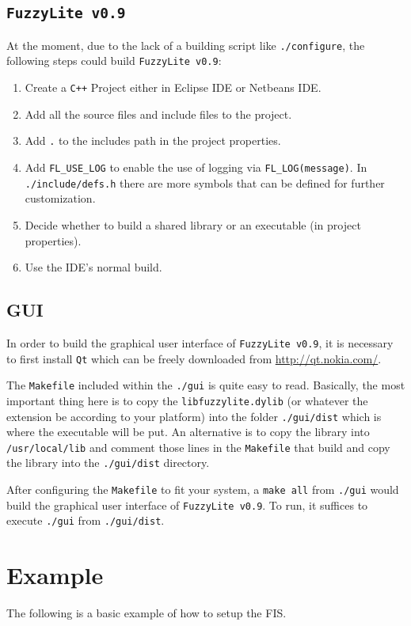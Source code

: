 \documentclass[11pt, final, a4paper]{article}
\newcommand{\fl}{\texttt{FuzzyLite v0.9}}
\begin{document}
	\subsection{\fl}
		At the moment, due to the lack of a building script like \texttt{./configure}, the following steps could build \fl:
		\begin{enumerate}
			\item Create a \texttt{C++} Project either in Eclipse IDE or Netbeans IDE.
			\item Add all the source files and include files to the project.
			\item Add \texttt{.} to the includes path in the project properties.
			\item Add \texttt{FL\_USE\_LOG} to enable the use of logging via \texttt{FL\_LOG(message)}. In \texttt{./include/defs.h} there are more symbols that can be defined for further customization.
			\item Decide whether to build a shared library or an executable (in project properties).
			\item Use the IDE's normal build.
		\end{enumerate}

	\subsection{GUI}
		In order to build the graphical user interface of \fl, it is necessary to first install \texttt{Qt} which can be freely downloaded from \url{http://qt.nokia.com/}. 
		
		The \texttt{Makefile} included within the \texttt{./gui} is quite easy to read. Basically, the most important thing here is to copy the \texttt{libfuzzylite.dylib} (or whatever the extension be according to your platform) into the folder \texttt{./gui/dist} which is where the executable will be put. An alternative is to copy the library into \texttt{/usr/local/lib} and comment those lines in the \texttt{Makefile} that build and copy the library into the \texttt{./gui/dist} directory.
		
		After configuring the \texttt{Makefile} to fit your system, a \texttt{make all} from \texttt{./gui} would build the graphical user interface of \fl. To run, it suffices to execute \texttt{./gui} from \texttt{./gui/dist}.
	
	
	\section{Example}
	The following is a basic example of how to setup the FIS.
	
\end{document}
